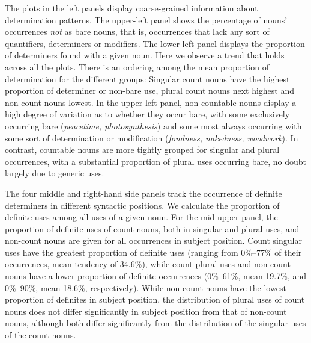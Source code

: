 \documentclass[output=paper]{langscibook}
\begin{document}
The plots in the left panels display coarse-grained information about determination patterns. The upper-left panel shows the percentage of nouns' occurrences \textit{not} as bare nouns, that is, occurrences that lack any sort of quantifiers, determiners or modifiers.  The lower-left panel displays the proportion of determiners found with a given noun. Here we observe a trend that holds across all the plots. There is an ordering among the mean proportion of determination for the different groups:  Singular count nouns have the highest proportion of determiner or non-bare use, plural count nouns next highest and non-count nouns lowest.   In the upper-left panel, non-countable nouns display  a high degree of variation as to whether they occur bare, with some exclusively occurring bare (\textit{peacetime, photosynthesis}) and some most always occurring with some sort of determination or modification (\textit{fondness, nakedness, woodwork}). In contrast, countable nouns are more tightly grouped for singular and plural occurrences, with a substantial proportion of plural uses occurring bare, no doubt largely due to generic uses.   %









The four middle and right-hand side panels track the occurrence of definite determiners in different syntactic positions.  We calculate the proportion of definite uses among all uses of a given noun.  For the mid-upper panel, the proportion of definite uses of count nouns, both in singular and plural uses, and non-count nouns are given for all occurrences in subject position.  Count singular uses have the greatest proportion of definite uses (ranging from 0\%--77\% of their occurrences, mean tendency of  34.6\%), while count plural uses and non-count nouns have a lower proportion of definite occurrences (0\%--61\%, mean 19.7\%, and 0\%--90\%, mean 18.6\%, respectively). While non-count nouns have the lowest proportion of definites in subject position, the distribution of plural uses of count nouns does not differ significantly in subject position from that of non-count nouns, although both differ significantly from the distribution of the singular uses of the count nouns.
\end{document}
